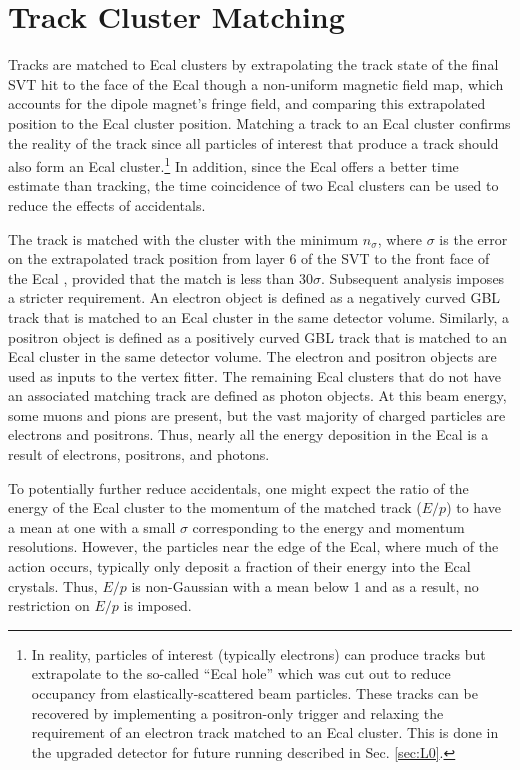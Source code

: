 \section{Track Cluster Matching} \label{sec:trackcluster}
Tracks are matched to Ecal clusters by extrapolating the track state of the final SVT hit to the face of the Ecal though a non-uniform magnetic field map, which accounts for the dipole magnet's fringe field, and comparing this extrapolated position to the Ecal cluster position. Matching a track to an Ecal cluster confirms the reality of the track since all particles of interest that produce a track should also form an Ecal cluster.\footnote{In reality, particles of interest (typically electrons) can produce tracks but extrapolate to the so-called ``Ecal hole'' which was cut out to reduce occupancy from elastically-scattered beam particles. These tracks can be recovered by implementing a positron-only trigger and relaxing the requirement of an electron track matched to an Ecal cluster. This is done in the upgraded detector for future running described in Sec. \ref{sec:L0}.} In addition, since the Ecal offers a better time estimate than tracking, the time coincidence of two Ecal clusters can be used to reduce the effects of accidentals.

The track is matched with the cluster with the minimum $n_{\sigma}$, where $\sigma$ is the error on the extrapolated track position from layer 6 of the SVT to the front face of the Ecal , provided that the match is less than 30$\sigma$. Subsequent analysis imposes a stricter requirement. An electron object is defined as a negatively curved GBL track that is matched to an Ecal cluster in the same detector volume. Similarly, a positron object is defined as a positively curved GBL track that is matched to an Ecal cluster in the same detector volume. The electron and positron objects are used as inputs to the vertex fitter. The remaining Ecal clusters that do not have an associated matching track are defined as photon objects. At this beam energy, some muons and pions are present, but the vast majority of charged particles are electrons and positrons. Thus, nearly all the energy deposition in the Ecal is a result of electrons, positrons, and photons.

To potentially further reduce accidentals, one might expect the ratio of the energy of the Ecal cluster to the momentum of the matched track ($E/p$) to have a mean at one with a small $\sigma$ corresponding to the energy and momentum resolutions. However, the particles near the edge of the Ecal, where much of the action occurs, typically only deposit a fraction of their energy into the Ecal crystals. Thus, $E/p$ is non-Gaussian with a mean below 1 and as a result, no restriction on $E/p$ is imposed.

